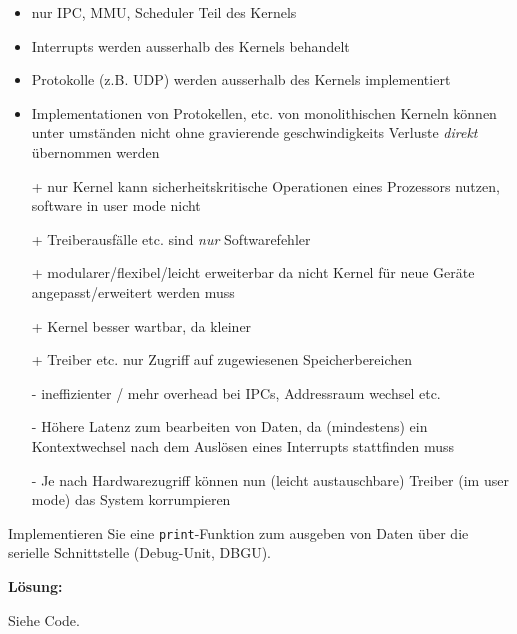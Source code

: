 \begin{description}
\begin{itemize}
  \item nur IPC, MMU, Scheduler Teil des Kernels
  \item Interrupts werden ausserhalb des Kernels behandelt
  \item Protokolle (z.B. UDP) werden ausserhalb des Kernels implementiert
  \item Implementationen von Protokellen, etc. von monolithischen Kerneln können unter umständen nicht ohne gravierende geschwindigkeits Verluste \emph{direkt} übernommen werden
  \item[+] nur Kernel kann sicherheitskritische Operationen eines Prozessors nutzen, software in user mode nicht
  \item[+] Treiberausfälle etc. sind \emph{nur} Softwarefehler
  \item[+] modularer/flexibel/leicht erweiterbar da nicht Kernel für neue Geräte angepasst/erweitert werden muss
  \item[+] Kernel besser wartbar, da kleiner
  \item[+] Treiber etc. nur Zugriff auf zugewiesenen Speicherbereichen
  \item[-] ineffizienter / mehr overhead bei IPCs, Addressraum wechsel etc.
  \item[-] Höhere Latenz zum bearbeiten von Daten, da (mindestens) ein Kontextwechsel nach dem Auslösen eines Interrupts stattfinden muss
  \item[-] Je nach Hardwarezugriff können nun (leicht austauschbare) Treiber (im user mode) das System korrumpieren
\end{itemize}



Implementieren Sie eine \texttt{print}-Funktion zum ausgeben von Daten über die serielle Schnittstelle (Debug-Unit, DBGU).

\textbf{Lösung:}

Siehe Code.


\end{description}

